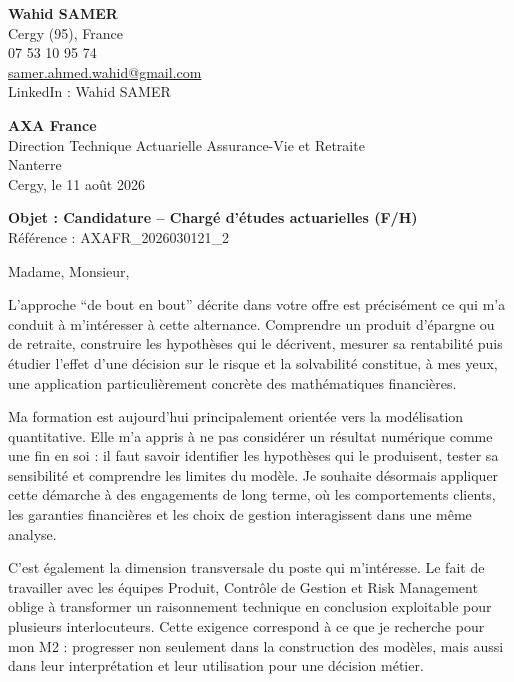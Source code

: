 \documentclass[11pt,a4paper]{article}
\begin{document}
\textbf{Wahid SAMER}\\
Cergy (95), France\\
07 53 10 95 74\\
\href{mailto:samer.ahmed.wahid@gmail.com}{samer.ahmed.wahid@gmail.com}\\
LinkedIn : Wahid SAMER

\vspace{0.4cm}
\begin{flushright}
\textbf{AXA France}\\
Direction Technique Actuarielle Assurance-Vie et Retraite\\
Nanterre\\[0.2cm]
Cergy, le 11 août 2026
\end{flushright}

\vspace{0.2cm}
\textbf{Objet : Candidature -- Chargé d'études actuarielles (F/H)}\\
Référence : AXAFR\_2026030121\_2

\vspace{0.35cm}
Madame, Monsieur,

L'approche ``de bout en bout'' décrite dans votre offre est précisément ce qui m'a conduit à m'intéresser à cette alternance. Comprendre un produit d'épargne ou de retraite, construire les hypothèses qui le décrivent, mesurer sa rentabilité puis étudier l'effet d'une décision sur le risque et la solvabilité constitue, à mes yeux, une application particulièrement concrète des mathématiques financières.

Ma formation est aujourd'hui principalement orientée vers la modélisation quantitative. Elle m'a appris à ne pas considérer un résultat numérique comme une fin en soi : il faut savoir identifier les hypothèses qui le produisent, tester sa sensibilité et comprendre les limites du modèle. Je souhaite désormais appliquer cette démarche à des engagements de long terme, où les comportements clients, les garanties financières et les choix de gestion interagissent dans une même analyse.

C'est également la dimension transversale du poste qui m'intéresse. Le fait de travailler avec les équipes Produit, Contrôle de Gestion et Risk Management oblige à transformer un raisonnement technique en conclusion exploitable pour plusieurs interlocuteurs. Cette exigence correspond à ce que je recherche pour mon M2 : progresser non seulement dans la construction des modèles, mais aussi dans leur interprétation et leur utilisation pour une décision métier.
\end{document}
